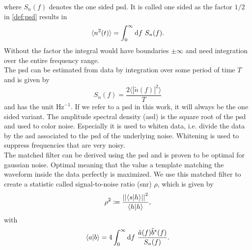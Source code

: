 where $S_n(f)$ denotes the one sided \gls{psd}. It is called one sided as the factor $1/2$ in \eqref{def:psd} results in
\begin{equation}
\langle n^2(t)\rangle = \int_0^\infty\diff f\ S_n(f).
\end{equation}
Without the factor the integral would have boundaries $\pm\infty$ and need integration over the entire frequency range.\\
The \gls{psd} can be estimated from data by integration over some period of time $T$ and is given by
\begin{equation}
S_n(f)=\frac{2\langle {\left|\tilde{n}(f)\right|}^2\rangle}{T}
\end{equation}
and has the unit $\text{Hz}^{-1}$. If we refer to a \gls{psd} in this work, it will always be the one sided variant. The amplitude spectral density (\gls{asd}) is the square root of the \gls{psd} and used to color noise. Especially it is used to whiten data, i.e. divide the data by the \gls{asd} associated to the \gls{psd} of the underlying noise. Whitening is used to suppress frequencies that are very noisy.\smallskip\\
The matched filter can be derived using the \gls{psd} and is proven to be optimal for gaussian noise. Optimal meaning that the value a template matching the waveform inside the data perfectly is maximized. We use this matched filter to create a statistic called signal-to-noise ratio (\gls{snr}) $\rho$, which is given by \cite{pycbc_live}
\begin{equation}\label{def:snr_matched_filter}
\rho^2\coloneqq\frac{{\left|\left| \langle s|h\rangle \right|\right|}^2}{\langle h|h\rangle},
\end{equation}
with
\begin{equation}
\langle a|b\rangle = 4\int_0^\infty\diff f\ \frac{\tilde{a}(f)\tilde{b}^\ast(f)}{S_n(f)}.
\end{equation}


